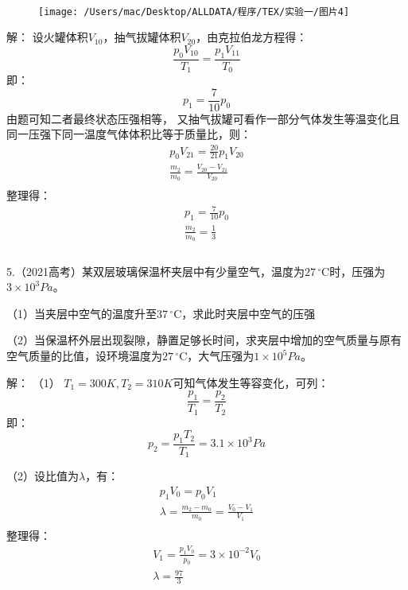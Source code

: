 \documentclass[UTF8]{ctexart}
\begin{document}
\begin{figure}[htbp]
\paragraph{} \texttt{[image: /Users/mac/Desktop/ALLDATA/程序/TEX/实验一/图片4]}\label{fig:figure2}
\end{figure}
解：
设火罐体积$V_{10}$，抽气拔罐体积$V_{20}$，由克拉伯龙方程得：
\[\frac{p_{0}V_{10}}{T_{1}} = \frac{p_{1}V_{11}}{T_{0}}\]
即：
\[p_{1} = \frac{7}{10}p_{0}\]
由题可知二者最终状态压强相等，
又抽气拔罐可看作一部分气体发生等温变化且同一压强下同一温度气体体积比等于质量比，则：
\begin{gather*}
    p_{0}V_{21} = \frac{20}{21}p_{1}V_{20}\\
    \frac{m_{2}}{m_{0}} = \frac{V_{20} - V_{21}}{V_{20}}\\
\end{gather*}
整理得：
\begin{gather*}
    p_{1} = \frac{7}{10}p_{0}\\
    \frac{m_{2}}{m_{0}} = \frac{1}{3}\\
\end{gather*}
\paragraph{}


\paragraph{}
    5.（2021高考）某双层玻璃保温杯夹层中有少量空气，温度为$27\,^{\circ}\mathrm{C}$时，压强为$3 \times 10^{3}Pa$。

    （1）当夹层中空气的温度升至$37\,^{\circ}\mathrm{C}$，求此时夹层中空气的压强

    （2）当保温杯外层出现裂隙，静置足够长时间，求夹层中增加的空气质量与原有空气质量的比值，设环境温度为$27\,^{\circ}\mathrm{C}$，大气压强为$1 \times 10^{5}Pa$。

解：
（1） $T_{1} = 300K, T_{2} = 310K$可知气体发生等容变化，可列：
\[\frac{p_{1}}{T_{1}} = \frac{p_{2}}{T_{2}}\]
即：
\[p_{2} = \frac{p_{1}T_{2}}{T_{1}} = 3.1 \times 10^{3}Pa\]

（2）设比值为$\lambda$，有：
\begin{gather*}
    p_{1}V_{0} = p_{0}V_{1}\\
    \lambda = \frac{m_{2} - m_{0}}{m_{0}} = \frac{V_{0} - V_{1}}{V_{1}}\\
\end{gather*}
整理得：
\begin{gather*}
    V_{1} = \frac{p_{1}V_{0}}{p_{0}} = 3 \times 10^{-2}V_{0}\\
    \lambda = \frac{97}{3}\\
\end{gather*}
\end{document}

